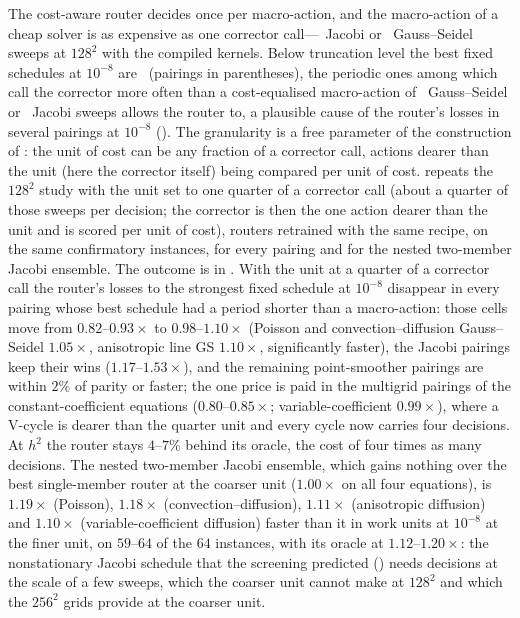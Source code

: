 The cost-aware router decides once per macro-action, and the macro-action of a cheap solver is as expensive as one corrector call---\caMJacobi\ Jacobi or \caMGs\ Gauss--Seidel sweeps at $128^2$ with the compiled kernels. Below truncation level the best fixed schedules at $10^{-8}$ are \caBestDeepSchedList\ (pairings in parentheses), the periodic ones among which call the corrector more often than a cost-equalised macro-action of \caMGs\ Gauss--Seidel or \caMJacobi\ Jacobi sweeps allows the router to, a plausible cause of the router's losses in several pairings at $10^{-8}$ (). The granularity is a free parameter of the construction of : the unit of cost can be any fraction of a corrector call, actions dearer than the unit (here the corrector itself) being compared per unit of cost.  repeats the $128^2$ study with the unit set to one quarter of a corrector call (about a quarter of those sweeps per decision; the corrector is then the one action dearer than the unit and is scored per unit of cost), routers retrained with the same recipe, on the same confirmatory instances, for every pairing and for the nested two-member Jacobi ensemble. The outcome is in . With the unit at a quarter of a corrector call the router's losses to the strongest fixed schedule at $10^{-8}$ disappear in every pairing whose best schedule had a period shorter than a macro-action: those cells move from $0.82$--$0.93\times$ to $0.98$--$1.10\times$ (Poisson and convection--diffusion Gauss--Seidel $1.05\times$, anisotropic line GS $1.10\times$, significantly faster), the Jacobi pairings keep their wins ($1.17$--$1.53\times$), and the remaining point-smoother pairings are within $2\%$ of parity or faster; the one price is paid in the multigrid pairings of the constant-coefficient equations ($0.80$--$0.85\times$; variable-coefficient $0.99\times$), where a V-cycle is dearer than the quarter unit and every cycle now carries four decisions. At $h^2$ the router stays $4$--$7\%$ behind its oracle, the cost of four times as many decisions. The nested two-member Jacobi ensemble, which gains nothing over the best single-member router at the coarser unit ($1.00\times$ on all four equations), is $1.19\times$ (Poisson), $1.18\times$ (convection--diffusion), $1.11\times$ (anisotropic diffusion) and $1.10\times$ (variable-coefficient diffusion) faster than it in work units at $10^{-8}$ at the finer unit, on $59$--$64$ of the $64$ instances, with its oracle at $1.12$--$1.20\times$: the nonstationary Jacobi schedule that the screening predicted () needs decisions at the scale of a few sweeps, which the coarser unit cannot make at $128^2$ and which the $256^2$ grids provide at the coarser unit.

